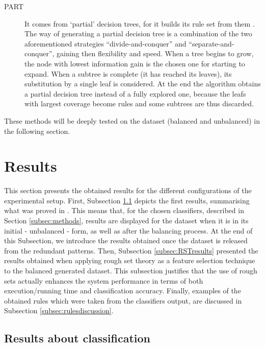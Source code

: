 \documentclass{llncs}
\begin{document}
\begin{description}
 \item[PART] It comes from `partial' decision trees, for it builds its rule set from them \cite{Frank1998}. The way of generating a partial decision tree is a combination of the two aforementioned strategies ``divide-and-conquer'' and ``separate-and-conquer'', gaining then flexibility and speed. When a tree begins to grow, the node with lowest information gain is the chosen one for starting to expand. When a subtree is complete (it has reached its leaves), its substitution by a single leaf is considered. At the end the algorithm obtains a partial decision tree instead of a fully explored one, because the leafs with largest coverage become rules and some subtrees are thus discarded.
 \end{description}

These methods will be deeply tested on the dataset (balanced and unbalanced) in the following section.

%
\section{Results}
\label{sec:results}

This section presents the obtained results for the different configurations of the experimental setup. First, Subsection \ref{subsec:firstresults} depicts the first results, summarising what was proved in \cite{ECTA}. This means that, for the chosen classifiers, described in Section \ref{subsec:methods}, results are displayed for the dataset when it is in its initial - unbalanced - form, as well as after the balancing process. At the end of this Subsection, we introduce the results obtained once the dataset is released from the redundant patterns. Then, Subsection \ref{subsec:RSTresults} presented the results obtained when applying rough set theory as a feature selection technique to the balanced generated dataset. This subsection justifies that the use of rough sets actually enhances the system performance in terms of  both execution/running time and classification accuracy. Finally, examples of the obtained rules which were taken from the classifiers output, are discussed in Subsection \ref{subsec:rulesdiscussion}.
 
\subsection{Results about classification}
\label{subsec:firstresults}
\end{document}
